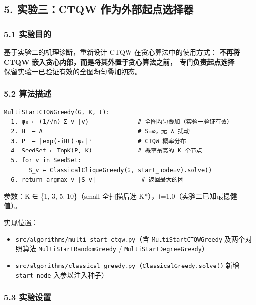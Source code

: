 \documentclass[
  11pt,
]{ctexart}
\providecommand{\tightlist}{%
  \setlength{\itemsep}{0pt}\setlength{\parskip}{0pt}}
\begin{document}
\subsection{5. 实验三：CTQW
作为外部起点选择器}\label{ux5b9eux9a8cux4e09ctqw-ux4f5cux4e3aux5916ux90e8ux8d77ux70b9ux9009ux62e9ux5668}

\subsubsection{5.1 实验目的}\label{ux5b9eux9a8cux76eeux7684-2}

基于实验二的机理诊断，重新设计 CTQW 在贪心算法中的使用方式：
\textbf{不再将 CTQW 嵌入贪心内部，而是将其外置于贪心算法之前，
专门负责起点选择}------保留实验一已验证有效的全图均匀叠加初态。

\subsubsection{5.2 算法描述}\label{ux7b97ux6cd5ux63cfux8ff0}

\begin{verbatim}
MultiStartCTQWGreedy(G, K, t):
  1. ψ₀ ← (1/√n) Σ_v |v⟩              # 全图均匀叠加（实验一验证有效）
  2. H  ← A                           # S=∅，无 λ 扰动
  3. P  ← |exp(-iHt)·ψ₀|²             # CTQW 概率分布
  4. SeedSet ← TopK(P, K)             # 概率最高的 K 个节点
  5. for v in SeedSet:
       S_v ← ClassicalCliqueGreedy(G, start_node=v).solve()
  6. return argmax_v |S_v|             # 返回最大的团
\end{verbatim}

参数：K ∈ \{1, 3, 5, 10\}（small 全扫描后选
K*），t=1.0（实验二已知最稳健值）。

实现位置：

\begin{itemize}
\tightlist
\item
  \texttt{src/algorithms/multi\_start\_ctqw.py}（含
  \texttt{MultiStartCTQWGreedy} 及两个对照算法
  \texttt{MultiStartRandomGreedy} / \texttt{MultiStartDegreeGreedy}）
\item
  \texttt{src/algorithms/classical\_greedy.py}（\texttt{ClassicalGreedy.solve()}
  新增 \texttt{start\_node} 入参以注入种子）
\end{itemize}

\subsubsection{5.3 实验设置}\label{ux5b9eux9a8cux8bbeux7f6e-4}
\end{document}
